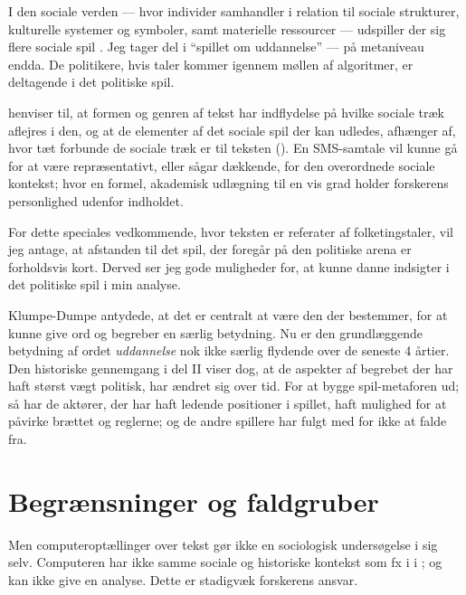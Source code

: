 I den sociale verden — hvor individer samhandler i relation til sociale strukturer, kulturelle systemer og symboler, samt materielle ressourcer — udspiller der sig flere sociale spil \autocite[s. 23]{evansMachineTranslationMining2016}.
Jeg tager del i “spillet om uddannelse” --- på metaniveau endda.
De politikere, hvis taler kommer igennem møllen af algoritmer, er deltagende i det politiske spil.

\citeauthor{evansComputationSociologicalImagination2019} henviser til, at formen og genren af tekst har indflydelse på hvilke sociale træk aflejres i den, og at de elementer af det sociale spil der kan udledes, afhænger af, hvor tæt forbunde de sociale træk er til teksten (\citeyear[s. 23f]{evansMachineTranslationMining2016}). 
En SMS-samtale vil kunne gå for at være repræsentativt, eller sågar dækkende, for den overordnede sociale kontekst; hvor en formel, akademisk udlægning til en vis grad holder forskerens personlighed udenfor indholdet.

For dette speciales vedkommende, hvor teksten er referater af folketingstaler, vil jeg antage, at afstanden til det spil, der foregår på den politiske arena er forholdsvis kort. 
Derved ser jeg gode muligheder for, at kunne danne indsigter i det politiske spil i min analyse.

Klumpe-Dumpe antydede, at det er centralt at være den der bestemmer, for at kunne give ord og begreber en særlig betydning.
Nu er den grundlæggende betydning af ordet \textit{uddannelse} nok ikke særlig flydende over de seneste 4 årtier.
Den historiske gennemgang i del II viser dog, at de aspekter af begrebet der har haft størst vægt politisk, har ændret sig over tid.
For at bygge spil-metaforen ud; så har de aktører, der har haft ledende positioner i spillet, haft mulighed for at påvirke brættet og reglerne; og de andre spillere har fulgt med for ikke at falde fra.

\section{Begrænsninger og faldgruber}

Men computeroptællinger over tekst gør ikke en sociologisk undersøgelse i sig selv.
Computeren har ikke samme sociale og historiske kontekst som fx i \citeauthor{juulDiskurserOmUngdom2013} i ; og kan ikke give en analyse.
Dette er stadigvæk forskerens ansvar.

